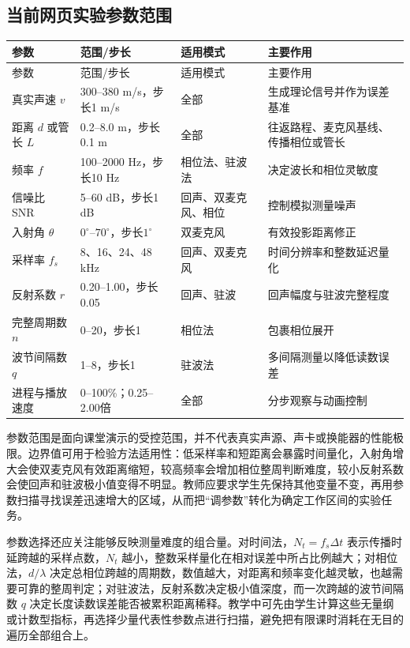 \documentclass[UTF8,a4paper,zihao=-4]{ctexart}
\begin{document}
\subsection{当前网页实验参数范围}
\begin{longtable}{p{3.2cm}p{3.0cm}p{4.2cm}p{3.7cm}}
\toprule
参数 & 范围/步长 & 适用模式 & 主要作用\\
\midrule
\endfirsthead
\toprule
参数 & 范围/步长 & 适用模式 & 主要作用\\
\midrule
\endhead
真实声速 $v$ & 300--380 m/s，步长1 m/s & 全部 & 生成理论信号并作为误差基准\\
距离 $d$ 或管长 $L$ & 0.2--8.0 m，步长0.1 m & 全部 & 往返路程、麦克风基线、传播相位或管长\\
频率 $f$ & 100--2000 Hz，步长10 Hz & 相位法、驻波法 & 决定波长和相位灵敏度\\
信噪比 SNR & 5--60 dB，步长1 dB & 回声、双麦克风、相位 & 控制模拟测量噪声\\
入射角 $\theta$ & $0^\circ$--$70^\circ$，步长$1^\circ$ & 双麦克风 & 有效投影距离修正\\
采样率 $f_s$ & 8、16、24、48 kHz & 回声、双麦克风 & 时间分辨率和整数延迟量化\\
反射系数 $r$ & 0.20--1.00，步长0.05 & 回声、驻波 & 回声幅度与驻波完整程度\\
完整周期数 $n$ & 0--20，步长1 & 相位法 & 包裹相位展开\\
波节间隔数 $q$ & 1--8，步长1 & 驻波法 & 多间隔测量以降低读数误差\\
进程与播放速度 & 0--100\%；0.25--2.00倍 & 全部 & 分步观察与动画控制\\
\bottomrule
\end{longtable}

参数范围是面向课堂演示的受控范围，并不代表真实声源、声卡或换能器的性能极限。边界值可用于检验方法适用性：低采样率和短距离会暴露时间量化，入射角增大会使双麦克风有效距离缩短，较高频率会增加相位整周判断难度，较小反射系数会使回声和驻波极小值变得不明显。教师应要求学生先保持其他变量不变，再用参数扫描寻找误差迅速增大的区域，从而把“调参数”转化为确定工作区间的实验任务。

参数选择还应关注能够反映测量难度的组合量。对时间法，$N_t=f_s\Delta t$ 表示传播时延跨越的采样点数，$N_t$ 越小，整数采样量化在相对误差中所占比例越大；对相位法，$d/\lambda$ 决定总相位跨越的周期数，数值越大，对距离和频率变化越灵敏，也越需要可靠的整周判定；对驻波法，反射系数决定极小值深度，而一次跨越的波节间隔数 $q$ 决定长度读数误差能否被累积距离稀释。教学中可先由学生计算这些无量纲或计数型指标，再选择少量代表性参数点进行扫描，避免把有限课时消耗在无目的遍历全部组合上。
\end{document}
